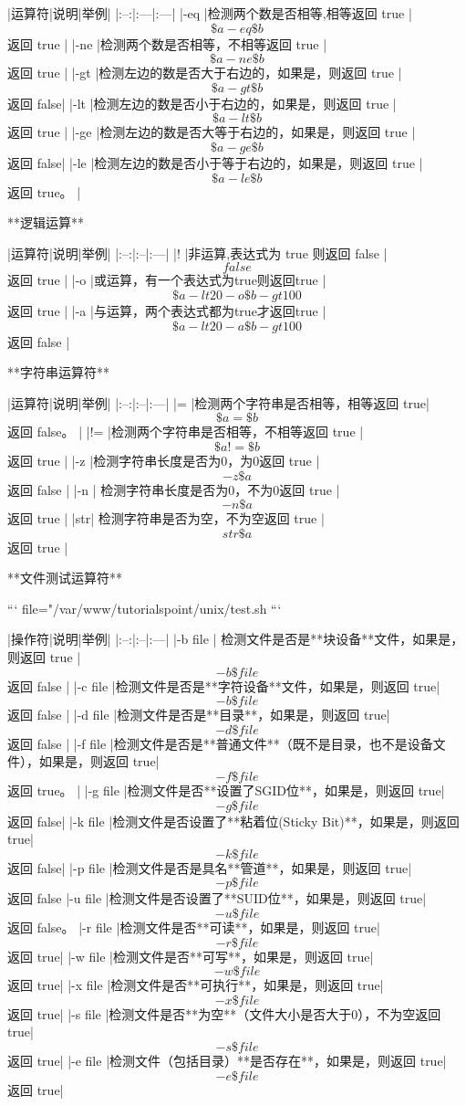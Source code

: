 |运算符|说明|举例|
|:--:|:---|:---|
|-eq |检测两个数是否相等,相等返回 true | \[ \$a -eq \$b \] 返回 true |
|-ne |检测两个数是否相等，不相等返回 true | \[ \$a -ne \$b \] 返回 true |
|-gt |检测左边的数是否大于右边的，如果是，则返回 true | \[ \$a -gt \$b \] 返回 false|
|-lt |检测左边的数是否小于右边的，如果是，则返回 true | \[ \$a -lt \$b \] 返回 true |
|-ge |检测左边的数是否大等于右边的，如果是，则返回 true | \[ \$a -ge \$b \] 返回 false|
|-le |检测左边的数是否小于等于右边的，如果是，则返回 true | \[ \$a -le \$b \] 返回 true。 |

**逻辑运算**

|运算符|说明|举例|
|:--:|:--|:---|
|!  |非运算,表达式为 true 则返回 false | \[ \! false \] 返回 true |
|-o |或运算，有一个表达式为true则返回true | \[ \$a -lt 20 -o \$b -gt 100 \] 返回 true |
|-a |与运算，两个表达式都为true才返回true | \[ \$a -lt 20 -a \$b -gt 100 \] 返回 false |

**字符串运算符**

|运算符|说明|举例|
|:--:|:--|:---|
|=   |检测两个字符串是否相等，相等返回 true| \[ \$a = \$b \] 返回 false。 |
|!=  |检测两个字符串是否相等，不相等返回 true | \[ \$a != \$b \] 返回 true |
|-z  |检测字符串长度是否为0，为0返回 true |  \[ -z \$a \] 返回 false  |
|-n | 检测字符串长度是否为0，不为0返回 true |  \[ -n \$a \] 返回 true |
|str| 检测字符串是否为空，不为空返回 true | \[str \$a \] 返回 true  |

**文件测试运算符**

```
file="/var/www/tutorialspoint/unix/test.sh
```

|操作符|说明|举例|
|:--:|:--|:---|
|-b file | 检测文件是否是**块设备**文件，如果是，则返回 true | \[ -b \$file \] 返回 false |
|-c file |检测文件是否是**字符设备**文件，如果是，则返回 true| \[ -b \$file \] 返回 false |
|-d file |检测文件是否是**目录**，如果是，则返回 true| \[ -d \$file \] 返回 false |
|-f file |检测文件是否是**普通文件**（既不是目录，也不是设备文件），如果是，则返回 true| \[ -f \$file \] 返回 true。 |
|-g file |检测文件是否**设置了SGID位**，如果是，则返回 true| \[ -g \$file \] 返回 false|
|-k file |检测文件是否设置了**粘着位(Sticky Bit)**，如果是，则返回 true| \[ -k \$file \] 返回 false|
|-p file |检测文件是否是具名**管道**，如果是，则返回 true| \[ -p \$file \] 返回 false
|-u file |检测文件是否设置了**SUID位**，如果是，则返回 true| \[ -u \$file \] 返回 false。
|-r file |检测文件是否**可读**，如果是，则返回 true|\[ -r \$file \] 返回 true|
|-w file |检测文件是否**可写**，如果是，则返回 true| \[ -w \$file \] 返回 true|
|-x file |检测文件是否**可执行**，如果是，则返回 true| \[ -x \$file \] 返回 true|
|-s file |检测文件是否**为空**（文件大小是否大于0），不为空返回 true| \[ -s \$file \] 返回 true|
|-e file |检测文件（包括目录）**是否存在**，如果是，则返回 true| \[ -e \$file \] 返回 true|

